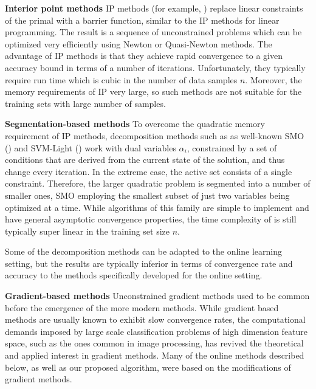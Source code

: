 {\bf Interior point methods}
IP methods (for example, \cite{boyd}) replace linear constraints of the primal with a barrier function, similar to the IP methods for linear programming.  The result is a sequence of unconstrained problems which can be optimized very efficiently using Newton or Quasi-Newton methods. The advantage of IP methods is that they achieve rapid convergence to a given accuracy bound in terms of a number of iterations. Unfortunately, they typically require run time which is cubic in the number of data samples $n$. Moreover, the memory requirements of IP  very large, so such methods are not suitable for the training sets with large number of samples.

{\bf Segmentation-based methods}
To overcome the quadratic memory requirement of IP methods, decomposition methods such as  as well-known SMO (\cite{platt}) and SVM-Light (\cite{svmlight}) work with dual variables $\alpha_i$, constrained by a set of conditions that are derived from the current state of the solution, and thus change every iteration.  In the extreme case, the active set consists of a single constraint. Therefore, the larger quadratic problem is segmented into a number of smaller ones, SMO employing the smallest subset of just two variables being optimized at a time. While algorithms of  this family are simple to implement and have general asymptotic convergence properties, the time complexity of  is  still typically super linear in the training set size $n$. 

Some of the decomposition methods can be adapted to the online learning setting, but the results are typically inferior in terms of convergence rate and accuracy to the methods specifically developed for the online setting.

{\bf Gradient-based methods}
Unconstrained gradient methods used to be common before the emergence of the more modern methods. While gradient based methods are usually known to exhibit slow convergence rates, the computational demands imposed by large scale classification problems of high dimension feature space, such as the ones common in image processing,  has revived the theoretical and applied interest in gradient methods. Many of the online methods described below, as well as our proposed algorithm, were based on the modifications of gradient methods.

